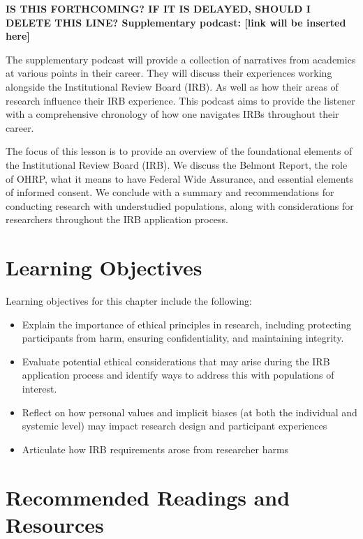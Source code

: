 \documentclass[
  11pt,
]{book}
\providecommand{\tightlist}{%
  \setlength{\itemsep}{0pt}\setlength{\parskip}{0pt}}
\begin{document}
\textbf{IS THIS FORTHCOMING? IF IT IS DELAYED, SHOULD I DELETE THIS LINE? Supplementary podcast: {[}link will be inserted here{]}}

The supplementary podcast will provide a collection of narratives from academics at various points in their career. They will discuss their experiences working alongside the Institutional Review Board (IRB). As well as how their areas of research influence their IRB experience. This podcast aims to provide the listener with a comprehensive chronology of how one navigates IRBs throughout their career.

The focus of this lesson is to provide an overview of the foundational elements of the Institutional Review Board (IRB). We discuss the Belmont Report, the role of OHRP, what it means to have Federal Wide Assurance, and essential elements of informed consent. We conclude with a summary and recommendations for conducting research with understudied populations, along with considerations for researchers throughout the IRB application process.

\section{Learning Objectives}\label{learning-objectives-7}

Learning objectives for this chapter include the following:

\begin{itemize}
\tightlist
\item
  Explain the importance of ethical principles in research, including protecting participants from harm, ensuring confidentiality, and maintaining integrity.
\item
  Evaluate potential ethical considerations that may arise during the IRB application process and identify ways to address this with populations of interest.
\item
  Reflect on how personal values and implicit biases (at both the individual and systemic level) may impact research design and participant experiences\\
\item
  Articulate how IRB requirements arose from researcher harms
\end{itemize}

\section{Recommended Readings and Resources}\label{recommended-readings-and-resources-4}
\end{document}
